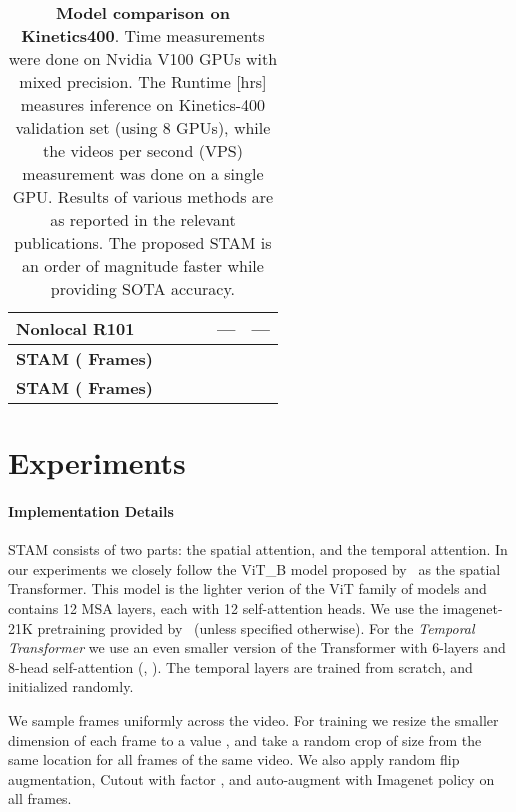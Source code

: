\documentclass[10pt,twocolumn,letterpaper]{article}
\begin{document}
\begin{table*}[ht!]
\begin{tabular}{|l|c|c|c|c|c|}
Nonlocal R101                                                            &                                   &                                         &               &  ---    & --- \\
\hline
\textbf{STAM ( Frames)}                                                &                          &                                         &          &     & \\
\textbf{STAM ( Frames)}                                                &                          &                                        &          &   &    \\
\hline
\end{tabular}
\medskip
\caption{\textbf{Model comparison on Kinetics400}. Time measurements were done on Nvidia V100 GPUs with mixed precision. The Runtime [hrs] measures inference on Kinetics-400 validation set (using 8 GPUs), while the videos per second (VPS) measurement was done on a single GPU. Results of various methods are as reported in the relevant publications. The proposed STAM is an order of magnitude faster while providing SOTA accuracy.}
    \label{Table:models_comparison}
\end{table*} 
\section{Experiments}

\paragraph{Implementation Details} 
STAM consists of two parts: the spatial attention, and the temporal attention. In our experiments we closely follow the ViT\_B model proposed by~\cite{vaswani2017attention} as the spatial Transformer.  This model is the lighter verion of the ViT family of models and contains 12 MSA layers, each with 12 self-attention heads.  We use the imagenet-21K pretraining provided by~\cite{vaswani2017attention} (unless specified otherwise).  For the \emph{Temporal Transformer} we use an even smaller version of the Transformer with 6-layers and 8-head self-attention (, ).  The temporal layers are trained from scratch, and initialized randomly. 


We sample frames uniformly across the video. For training we resize the smaller dimension of each frame to a value , and take a random crop of size  from the same location for all frames of the same video. We also apply random flip augmentation, Cutout with factor , and auto-augment with Imagenet policy on all frames.
\end{document}
